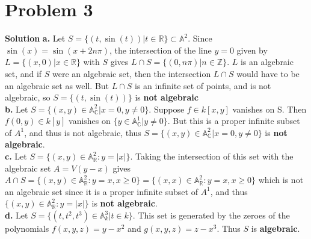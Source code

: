 \documentclass{article}
\begin{document}
\section{Problem 3}
\textbf{Solution} 
\textbf{a. } Let $S = \{(t, \sin(t)) | t \in \mathbb{R} \} \subset \mathbb{A}^2$. Since $\sin(x) = \sin(x+2n\pi)$,
 the intersection of the line $y = 0$ given by $L = \{(x, 0) | x \in \mathbb{R}   \}$ with $S$ gives $L \cap S = \{(0, n\pi) | n \in \mathbb{Z} \}$. $L$ is an algebraic set, 
 and if $S$ were an algebraic set, then the intersection $L \cap S$ 
would  have to be an algebraic set as well. But $L \cap S$ is an infinite set of points, and is not algebraic, so $S = \{ (t, \sin(t)) \} $ is \textbf{not algebraic}\\
\textbf{b. } Let $S = \{(x, y) \in \mathbb{A}_{\mathbb{C}}^2 | x=0, y \neq 0   \}$. Suppose $f \in k[x,y]$ vanishes on S. Then $f(0, y) \in k[y]$ vanishes on $\{y \in \mathbb{A}_{\mathbb{C}}^1 | y  \neq 0\}$. 
But this is a proper infinite subset of $A^1$, and thus is not algebraic, thus $S = \{(x, y) \in \mathbb{A}_{\mathbb{C}}^2 | x=0, y \neq 0   \}$ is \textbf{not algebraic}. \\
\textbf{c. } Let $S = \{(x, y) \in \mathbb{A}_{\mathbb{R}}^2 : y = |x|\}$. Taking the intersection of this set with the algebraic set $A = V(y-x)$ gives $A \cap S = \{(x, y) \in \mathbb{A}_{\mathbb{R}}^2: y=x, x \geq 0 \} = \{(x, x) \in \mathbb{A}_{\mathbb{R}}^2: y=x, x \geq 0 \}$
which is not an algebraic set since it is a proper infinite subset of $A^1$, and thus $\{(x, y) \in \mathbb{A}_{\mathbb{R}}^2 : y = |x|\}$ is \textbf{not algebraic}. \\
\textbf{d. } Let $S = \{(t, t^2, t^3) \in \mathbb{A}_k^3 | t \in k\}$. This set is generated by the zeroes of the polynomials $f(x, y, z) = y - x^2$ and $g(x, y, z) = z - x^3$. Thus $S$ is \textbf{algebraic}.
\end{document}
